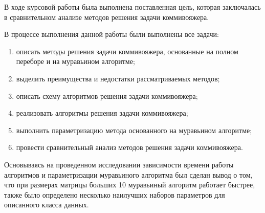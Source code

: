
В ходе курсовой работы была выполнена поставленная цель, которая заключалась в сравнительном анализе методов решения задачи коммивояжера.

В процессе выполнения данной работы были выполнены все задачи:
\begin{enumerate}
	\item описать методы решения задачи коммивояжера, основанные на полном переборе и на муравьином алгоритме;
	\item выделить преимущества и недостатки рассматриваемых методов;
	\item описать схему алгоритмов решения задачи коммивояжера;
	\item реализовать алгоритмы решения задачи коммивояжера;
	\item выполнить параметризацию метода основанного на муравьином алгоритме;
	\item провести сравнительный анализ методов решения задачи коммивояжера.
\end{enumerate}

Основываясь на проведенном исследовании зависимости времени работы алгоритмов и параметризации муравьиного алгоритма был сделан вывод о том, что при размерах матрицы больших 10 муравьиный алгоритм работает быстрее, также было определено несколько наилучших наборов параметров для описанного класса данных.